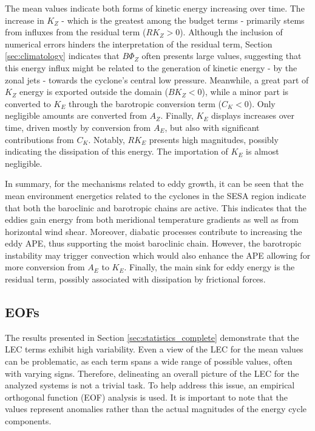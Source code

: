 The mean values indicate both forms of kinetic energy increasing over time. The increase in $K_Z$ - which is the greatest among the budget terms - primarily stems from influxes from the residual term ($RK_Z > 0$). Although the inclusion of numerical errors hinders the interpretation of the residual term, Section \ref{sec:climatology} indicates that $B\Phi_Z$ often presents large values, suggesting that this energy influx might be related to the generation of kinetic energy - by the zonal jets - towards the cyclone's central low pressure. Meanwhile, a great part of $K_Z$ energy is exported outside the domain ($BK_Z < 0$), while a minor part is converted to $K_E$ through the barotropic conversion term ($C_K < 0$). Only negligible amounts are converted from $A_Z$. Finally, $K_E$ displays increases over time, driven mostly by conversion from $A_E$, but also with significant contributions from $C_K$. Notably, $RK_E$ presents high magnitudes, possibly indicating the dissipation of this energy. The importation of $K_E$ is almost negligible.

In summary, for the mechanisms related to eddy growth, it can be seen that the mean environment energetics related to the cyclones in the SESA region indicate that both the baroclinic and barotropic chains are active. This indicates that the eddies gain energy from both meridional temperature gradients as well as from horizontal wind shear. Moreover, diabatic processes contribute to increasing the eddy APE, thus supporting the moist baroclinic chain. However, the barotropic instability may trigger convection which would also enhance the APE allowing for more conversion from $A_E$ to $K_E$. Finally, the main sink for eddy energy is the residual term, possibly associated with dissipation by frictional forces.

\subsection{EOFs}\label{sec:eof_complete}

The results presented in Section \ref{sec:statistics_complete} demonstrate that the LEC terms exhibit high variability. Even a view of the LEC for the mean values can be problematic, as each term spans a wide range of possible values, often with varying signs. Therefore, delineating an overall picture of the LEC for the analyzed systems is not a trivial task. To help address this issue, an empirical orthogonal function (EOF) analysis is used. It is important to note that the values represent anomalies rather than the actual magnitudes of the energy cycle components.

